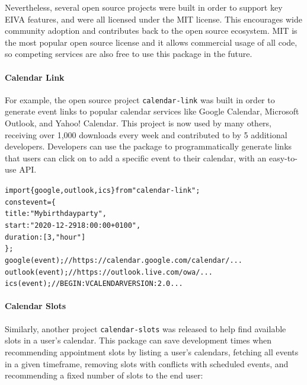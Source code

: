 \documentclass{article}
\begin{document}
Nevertheless, several open source projects were built in order to support key EIVA features, and were all licensed under the MIT license. This encourages wide community adoption and contributes back to the open source ecosystem. MIT is the most popular open source license and it allows commercial usage of all code, so competing services are also free to use this package in the future.

\paragraph{Calendar Link}

For example, the open source project \texttt{calendar-link} was built in order to generate event links to popular calendar services like Google Calendar, Microsoft Outlook, and Yahoo! Calendar. This project is now used by many others, receiving over 1,000 downloads every week and contributed to by 5 additional developers. Developers can use the package to programmatically generate links that users can click on to add a specific event to their calendar, with an easy-to-use API.

\begin{alltt}
\textcolor{keyword}{import} \{ google, outlook, ics \} \textcolor{keyword}{from} \textcolor{string}{"calendar-link"};
\textcolor{keyword}{const} event = \{
  \textcolor{symbol}{title}: \textcolor{string}{"My birthday party"},
  \textcolor{symbol}{start}: \textcolor{string}{"2020-12-29 18:00:00 +0100"},
  \textcolor{symbol}{duration}: [\textcolor{literal}{3}, \textcolor{string}{"hour"}]
\};
\textcolor{variable}{google}(event); \textcolor{comment}{// https://calendar.google.com/calendar/...}
\textcolor{variable}{outlook}(event); \textcolor{comment}{// https://outlook.live.com/owa/...}
\textcolor{variable}{ics}(event); \textcolor{comment}{// BEGIN:VCALENDAR VERSION:2.0...}
\end{alltt}

\paragraph{Calendar Slots}

Similarly, another project \texttt{calendar-slots} was released to help find available slots in a user's calendar. This package can save development times when recommending appointment slots by listing a user's calendars, fetching all events in a given timeframe, removing slots with conflicts with scheduled events, and recommending a fixed number of slots to the end user:
\end{document}
